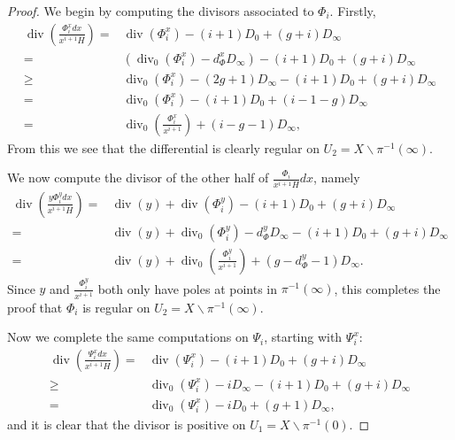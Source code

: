 \documentclass[draft, 11pt]{article} %
\theoremstyle{plain}
\theoremstyle{remark}
\DeclareMathOperator{\di}{div}
\begin{document}
\begin{proof}
We begin by computing the divisors associated to $\Phi_i$.
Firstly,
\begin{align*}
\di \left( \frac{\Phi_i^x dx}{x^{i+1} H} \right)  = &  \di(\Phi_i^x) -(i+1)D_0 + (g+i)D_\infty\\
 = & \left( \di_0(\Phi_i^x) -d_\Phi^xD_\infty\right) -(i+1)D_0 + (g+i)D_\infty\\
 \geq & \di_0(\Phi_i^x) - (2g+1)D_\infty - (i+1)D_0 + (g+i)D_\infty \\
 = &  \di_0(\Phi_i^x) - (i+1)D_0 + (i-1-g)D_\infty \\
 =  & \di_0 \left( \frac{\Phi_i^x}{x^{i+1}} \right) + (i-g-1)D_\infty,
\end{align*}
From this we see that the differential is clearly regular on $U_2 = X \backslash \pi^{-1}(\infty)$.

We now compute the divisor of the other half of $\frac{\Phi_i}{x^{i+1}H}dx$, namely
\begin{align*}
\di\left(\frac{y\Phi_i^y dx}{x^{i+1}H} \right)  = & \di(y) + \di(\Phi_i^y) -(i+1)D_0 + (g+i)D_\infty\\
 = & \di(y) + \di_0(\Phi_i^y) - d_\Phi^yD_\infty -(i+1)D_0 + (g+i)D_\infty \\
 = & \di(y) + \di_0\left(\frac{\Phi_i^y}{x^{i+1}} \right) + (g-d_\Phi^y -1)D_\infty.
\end{align*}
Since $y$ and $\frac{\Phi_i^y}{x^{i+1}}$ both only have poles at points in $\pi^{-1}(\infty)$, this completes the proof that $\Phi_i$ is regular on $U_2 = X \backslash \pi^{-1}(\infty)$.

Now we complete the same computations on $\Psi_i$, starting with $\Psi_i^x$:
\begin{align*}
\di\left( \frac{\Psi_i^x dx}{x^{i+1}H} \right)  = &  \di(\Psi_i^x)  - (i+1)D_0 + (g+i)D_\infty \\
 \geq &  \di_0(\Psi_i^x ) - iD_\infty - (i+1)D_0 + (g+i)D_\infty \\
 = &  \di_0(\Psi_i^x) - iD_0 + (g+1)D_\infty,
\end{align*}
and it is clear that the divisor is positive on $U_1 = X \backslash \pi^{-1}(0)$.


\end{proof}
\end{document}
